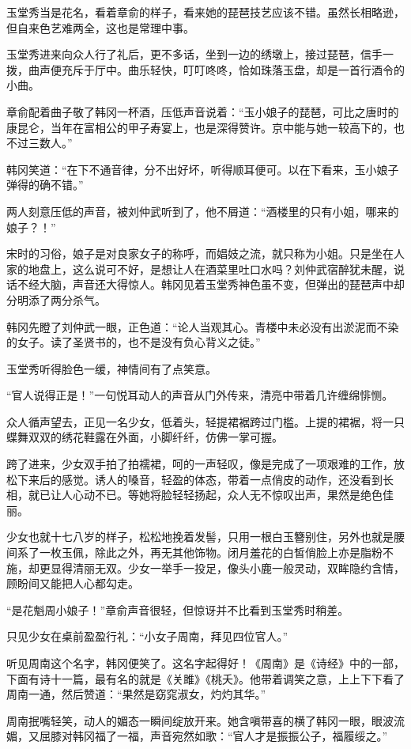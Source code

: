 玉堂秀当是花名，看着章俞的样子，看来她的琵琶技艺应该不错。虽然长相略逊，但自来色艺难两全，这也是常理中事。

玉堂秀进来向众人行了礼后，更不多话，坐到一边的绣墩上，接过琵琶，信手一拨，曲声便充斥于厅中。曲乐轻快，叮叮咚咚，恰如珠落玉盘，却是一首行酒令的小曲。

章俞配着曲子敬了韩冈一杯酒，压低声音说着：“玉小娘子的琵琶，可比之唐时的康昆仑，当年在富相公的甲子寿宴上，也是深得赞许。京中能与她一较高下的，也不过三数人。”

韩冈笑道：“在下不通音律，分不出好坏，听得顺耳便可。以在下看来，玉小娘子弹得的确不错。”

两人刻意压低的声音，被刘仲武听到了，他不屑道：“酒楼里的只有小姐，哪来的娘子？！”

宋时的习俗，娘子是对良家女子的称呼，而娼妓之流，就只称为小姐。只是坐在人家的地盘上，这么说可不好，是想让人在酒菜里吐口水吗？刘仲武宿醉犹未醒，说话不经大脑，声音还大得惊人。韩冈见着玉堂秀神色虽不变，但弹出的琵琶声中却分明添了两分杀气。

韩冈先瞪了刘仲武一眼，正色道：“论人当观其心。青楼中未必没有出淤泥而不染的女子。读了圣贤书的，也不是没有负心背义之徒。”

玉堂秀听得脸色一缓，神情间有了点笑意。

“官人说得正是！”一句悦耳动人的声音从门外传来，清亮中带着几许缠绵悱恻。

众人循声望去，正见一名少女，低着头，轻提裙裾跨过门槛。上提的裙裾，将一只蝶舞双双的绣花鞋露在外面，小脚纤纤，仿佛一掌可握。

跨了进来，少女双手拍了拍襦裙，呵的一声轻叹，像是完成了一项艰难的工作，放松下来后的感觉。诱人的嗓音，轻盈的体态，带着一点俏皮的动作，还没看到长相，就已让人心动不已。等她将脸轻轻扬起，众人无不惊叹出声，果然是绝色佳丽。

少女也就十七八岁的样子，松松地挽着发髻，只用一根白玉簪别住，另外也就是腰间系了一枚玉佩，除此之外，再无其他饰物。闭月羞花的白皙俏脸上亦是脂粉不施，却更显得清丽无双。少女一举手一投足，像头小鹿一般灵动，双眸隐约含情，顾盼间又能把人心都勾走。

“是花魁周小娘子！”章俞声音很轻，但惊讶并不比看到玉堂秀时稍差。

只见少女在桌前盈盈行礼：“小女子周南，拜见四位官人。”

听见周南这个名字，韩冈便笑了。这名字起得好！《周南》是《诗经》中的一部，下面有诗十一篇，最有名的就是《关雎》《桃夭》。他带着调笑之意，上上下下看了周南一通，然后赞道：“果然是窈窕淑女，灼灼其华。”

周南抿嘴轻笑，动人的媚态一瞬间绽放开来。她含嗔带喜的横了韩冈一眼，眼波流媚，又屈膝对韩冈福了一福，声音宛然如歌：“官人才是振振公子，福履绥之。”

